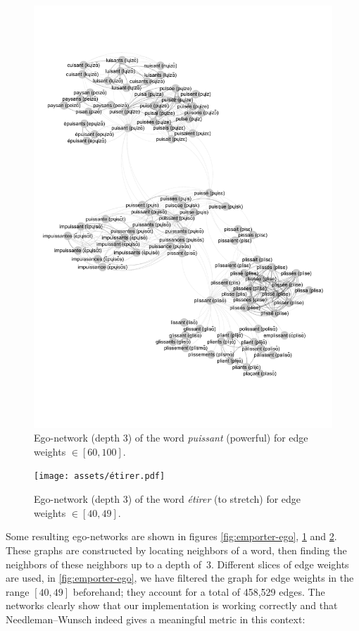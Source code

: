 \begin{figure}[H]
    \centering
    \includegraphics[width=\linewidth, trim=1cm 3.4cm 0.5cm 3.2cm, clip]{assets/puissant-ego.pdf}
    \caption{Ego-network (depth 3) of the word \textit{puissant} (powerful) for edge weights $\in [60, 100]$.}
    \label{fig:puissant-ego}
\end{figure}

\begin{figure}[H]
    \centering
    \texttt{[image: assets/étirer.pdf]}
    \caption{Ego-network (depth 3) of the word \textit{étirer} (to stretch) for edge weights $\in [40,49]$.}
    \label{fig:etirer-ego}
\end{figure}

Some resulting ego-networks are shown in figures \ref{fig:emporter-ego}, \ref{fig:puissant-ego} and \ref{fig:etirer-ego}. These graphs are constructed by locating neighbors of a word, then finding the neighbors of these neighbors up to a depth of~3. Different slices of edge weights are used, \eg in \autoref{fig:emporter-ego}, we have filtered the graph for edge weights in the range $[40,49]$ beforehand; they account for a total of 458,529 edges. The networks clearly show that our implementation is working correctly and that Needleman–Wunsch indeed gives a meaningful metric in this context:

